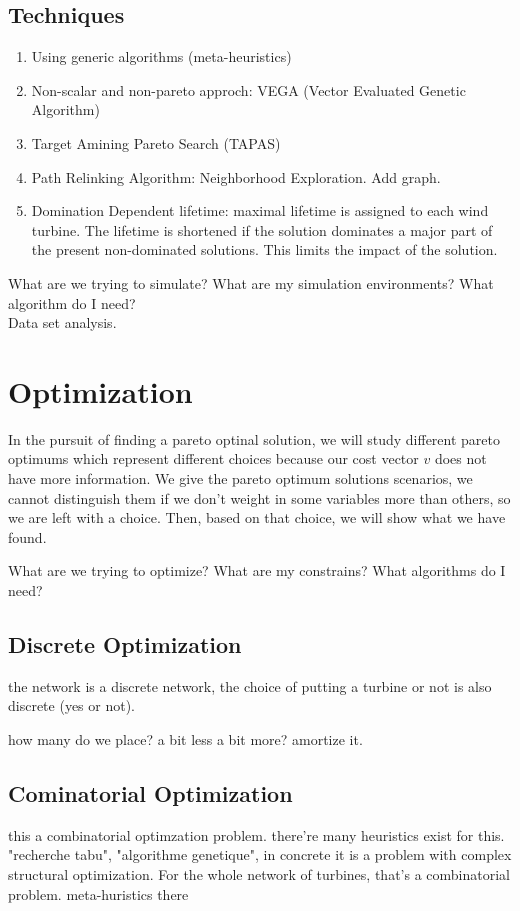 \documentclass[12pt]{article}
\begin{document}
\subsection{Techniques}
\begin{enumerate}
\item Using generic algorithms (meta-heuristics)
\item Non-scalar and non-pareto approch: VEGA (Vector Evaluated Genetic Algorithm)
\item Target Amining Pareto Search (TAPAS)
\item Path Relinking Algorithm: Neighborhood Exploration. Add graph.  
\item Domination Dependent lifetime: maximal lifetime is assigned to each wind turbine. The lifetime is shortened if the solution dominates a major part of the present non-dominated solutions. This limits the impact of the solution. 
\end{enumerate}

What are we trying to simulate? What are my simulation environments? What algorithm do I need? \\

Data set analysis. 


\section{Optimization}
In the pursuit of finding a pareto optinal solution, we will study different pareto optimums which represent different choices because our cost vector  $v$ does not have more information. We give the pareto optimum solutions scenarios, we cannot distinguish them if we don't weight in some variables more than others, so we are left with a choice. Then, based on that choice, we will show what we have found. 

What are we trying to optimize? What are my constrains? What algorithms do I need?

\subsection{Discrete Optimization}
the network is a discrete network, the choice of putting a turbine or not is also
discrete (yes or not). 

how many do we place? a bit less a bit more? amortize it.

\subsection{Cominatorial Optimization}
this a combinatorial optimzation problem. there're many heuristics exist for this. 
"recherche tabu", "algorithme genetique", in concrete it is a problem with complex
structural optimization. 
For the whole network of turbines, that's a combinatorial problem. meta-huristics there
\end{document}
